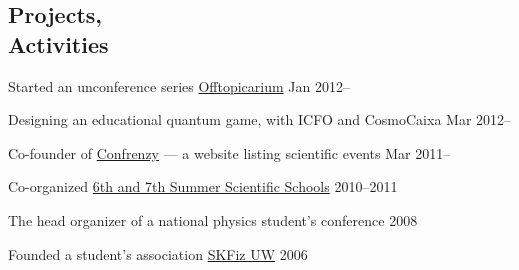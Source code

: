 \documentclass[margin,line]{resume}
\begin{document}
\begin{resume}
    \section{\mysidestyle Projects,\\Activities}

    \begin{list2}
    \item Started an unconference series \href{http://offtopicarium.wikidot.com/en:start}{Offtopicarium} \hfill { Jan 2012--}
    \item Designing an educational quantum game, with ICFO and CosmoCaixa \hfill { Mar 2012--}
    \item Co-founder of \href{http://confrenzy.com}{Confrenzy} --- a website listing scientific events \hfill { Mar 2011--}

    \item Co-organized \href{http://warsztatywww.wikidot.com/en}{6th and 7th Summer Scientific Schools} \hfill { 2010--2011}
    \item The head organizer of a national physics student's conference \hfill { 2008}
    \item Founded a student's association \href{http://skfiz.fuw.edu.pl/en}{SKFiz UW} \hfill { 2006}
    \end{list2}



\end{resume}
\end{document}
